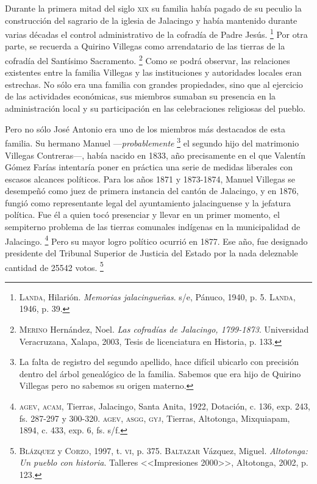 \documentclass[14pt,twoside,final]{extbook} %
\let\oldfootnote\footnote
\renewcommand\footnote[1]{%
\oldfootnote{\hspace{1mm}#1}}
\begin{document}
Durante la primera mitad del siglo \textsc{xix} su familia había pagado de su peculio la construcción del sagrario de la iglesia de Jalacingo y había mantenido durante varias décadas el control administrativo de la cofradía de Padre Jesús.\footnote{\textsc{Landa}, Hilarión. \emph{Memorias jalacingueñas}. s/e, Pánuco, 1940, p. 5. \textsc{Landa}, 1946, p. 39.} Por otra parte, se recuerda a Quirino Villegas como arrendatario de las tierras de la cofradía del Santísimo Sacramento.\footnote{\textsc{Merino} Hernández, Noel. \emph{Las cofradías de Jalacingo, 1799-1873}. Universidad Veracruzana, Xalapa, 2003, Tesis de licenciatura en Historia, p. 133.} Como se podrá observar, las relaciones existentes entre la familia Villegas y las instituciones y autoridades locales eran estrechas. No sólo era una familia con grandes propiedades, sino que al ejercicio de las actividades económicas, sus miembros sumaban su presencia en la administración local y su participación en las celebraciones religiosas del pueblo.

Pero no sólo José Antonio era uno de los miembros más destacados de esta familia. Su hermano Manuel ---\emph{probablemente}\footnote{La falta de registro del segundo apellido, hace difícil ubicarlo con precisión dentro del árbol genealógico de la familia. Sabemos que era hijo de Quirino Villegas pero no sabemos su origen materno.} el segundo hijo del matrimonio Villegas Contreras---, había nacido en 1833, año precisamente en el que Valentín Gómez Farías intentaría poner en práctica una serie de medidas liberales con escasos alcances políticos. Para los años 1871 y 1873-1874, Manuel Villegas se desempeñó como juez de primera instancia del cantón de Jalacingo, y en 1876, fungió como representante legal del ayuntamiento jalacinguense y la jefatura política. Fue él a quien tocó presenciar y llevar en un primer momento, el sempiterno problema de las tierras comunales indígenas en la municipalidad de Jalacingo.\footnote{\textsc{agev, acam}, Tierras, Jalacingo, Santa Anita, 1922, Dotación, c. 136, exp. 243, fs. 287-297 y 300-320. \textsc{agev, asgg, gyj}, Tierras, Altotonga, Mixquiapam, 1894, c. 433, exp. 6, fs. s/f.} Pero su mayor logro político ocurrió en 1877. Ese año, fue designado presidente del Tribunal Superior de Justicia del Estado por la nada deleznable cantidad de 25542 votos.\footnote{\textsc{Blázquez} y \textsc{Corzo}, 1997, t. \textsc{vi}, p. 375. \textsc{Baltazar} Vázquez, Miguel. \emph{Altotonga: Un pueblo con historia}. Talleres <<Impresiones 2000>>, Altotonga, 2002, p. 123.}
\end{document}
